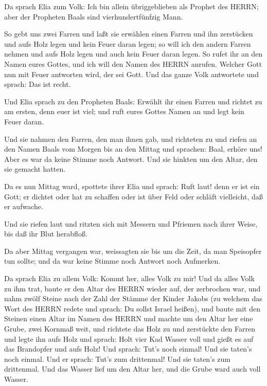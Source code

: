  Da sprach Elia zum Volk: Ich bin allein übriggeblieben als
Prophet des HERRN; aber der Propheten Baals sind vierhundertfünfzig
Mann.

 So gebt uns zwei Farren und laßt sie erwählen einen Farren
und ihn zerstücken und aufs Holz legen und kein Feuer daran legen; so
will ich den andern Farren nehmen und aufs Holz legen und auch kein
Feuer daran legen.  So rufet ihr an den Namen eures Gottes,
und ich will den Namen des HERRN anrufen. Welcher Gott nun mit Feuer
antworten wird, der sei Gott. Und das ganze Volk antwortete und sprach:
Das ist recht.

 Und Elia sprach zu den Propheten Baals: Erwählt ihr einen
Farren und richtet zu am ersten, denn euer ist viel; und ruft eures
Gottes Namen an und legt kein Feuer daran.

 Und sie nahmen den Farren, den man ihnen gab, und
richteten zu und riefen an den Namen Baals vom Morgen bis an den Mittag
und sprachen: Baal, erhöre uns! Aber es war da keine Stimme noch
Antwort. Und sie hinkten um den Altar, den sie gemacht hatten.

 Da es nun Mittag ward, spottete ihrer Elia und sprach:
Ruft laut! denn er ist ein Gott; er dichtet oder hat zu schaffen oder
ist über Feld oder schläft vielleicht, daß er aufwache.

 Und sie riefen laut und ritzten sich mit Messern und
Pfriemen nach ihrer Weise, bis daß ihr Blut herabfloß.

 Da aber Mittag vergangen war, weissagten sie bis um die
Zeit, da man Speisopfer tun sollte; und da war keine Stimme noch Antwort
noch Aufmerken.

 Da sprach Elia zu allem Volk: Kommt her, alles Volk zu
mir! Und da alles Volk zu ihm trat, baute er den Altar des HERRN wieder
auf, der zerbrochen war,  und nahm zwölf Steine nach der
Zahl der Stämme der Kinder Jakobs (zu welchem das Wort des HERRN redete
und sprach: Du sollst Israel heißen),  und baute mit den
Steinen einen Altar im Namen des HERRN und machte um den Altar her eine
Grube, zwei Kornmaß weit,  und richtete das Holz zu und
zerstückte den Farren und legte ihn aufs Holz  und sprach:
Holt vier Kad Wasser voll und gießt es auf das Brandopfer und aufs Holz!
Und sprach: Tut's noch einmal! Und sie taten's noch einmal. Und er
sprach: Tut's zum drittenmal! Und sie taten's zum drittenmal.
 Und das Wasser lief um den Altar her, und die Grube ward
auch voll Wasser.

